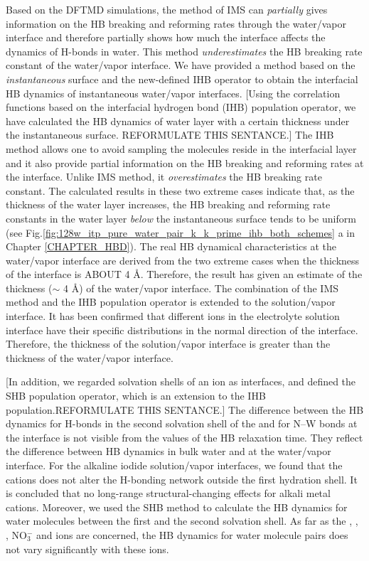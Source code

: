 Based on the DFTMD simulations, the method of IMS can \emph{partially} gives information on the HB breaking and reforming
rates through the water/vapor interface and therefore partially shows how much the interface affects the dynamics of H-bonds in water. 
This method \emph{underestimates} the HB breaking rate constant of the water/vapor interface. 
We have provided a method based on the \emph{instantaneous} surface and the new-defined
IHB operator to obtain the interfacial HB dynamics of instantaneous water/vapor interfaces.  
[Using the correlation functions based on the interfacial hydrogen bond (IHB) population operator, we have calculated the HB dynamics of water layer with a certain thickness 
under the instantaneous surface.  REFORMULATE THIS SENTANCE.]
The IHB method allows one to avoid sampling the molecules reside in the interfacial layer and
it also provide partial information on the HB breaking and reforming rates at the interface. 
Unlike IMS method, it \emph{overestimates} the HB breaking rate constant. The calculated results in these two extreme cases indicate that,
as the thickness of the water layer increases,
the HB breaking and reforming rate constants in the water layer \emph{below} the instantaneous surface tends to be uniform 
(see Fig.\thinspace\ref{fig:128w_itp_pure_water_pair_k_k_prime_ihb_both_schemes} a in Chapter \ref{CHAPTER_HBD}). 
The real HB dynamical characteristics at the water/vapor interface 
are derived from the two extreme cases when the thickness of the interface is ABOUT 4 \AA. 
Therefore, the result has given an estimate of the thickness ($\sim$ 4 \AA) of the water/vapor interface.  
The combination of the IMS method and the IHB population operator is extended to the solution/vapor interface. 
It has been confirmed that different ions in the electrolyte solution interface have their specific distributions in the normal direction of the interface. 
Therefore, the thickness of the solution/vapor interface is greater than the thickness of the water/vapor interface. 

[In addition, we regarded solvation shells of an ion as interfaces, 
and defined the SHB population operator, which is an extension to the IHB population.REFORMULATE THIS SENTANCE.]
The difference between the HB dynamics for H-bonds in the second solvation shell of the \Li and for N--W bonds 
at the interface is not visible from the values of the HB relaxation time. They reflect the difference between HB dynamics in 
bulk water and at the water/vapor interface. For the alkaline iodide solution/vapor interfaces, we found 
that the cations does not alter the H-bonding network outside the first hydration shell. 
It is concluded that no long-range structural-changing effects for alkali metal cations.
Moreover, we used the SHB method to calculate the HB dynamics for water molecules between the first and the second solvation shell.
As far as the \Li, \Na, \K, NO$^-_3$ and \I ions are concerned, 
the HB dynamics for water molecule pairs does not vary significantly with these ions.

